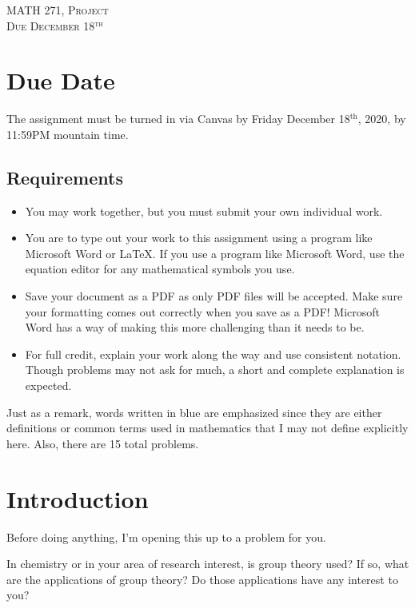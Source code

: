 \documentclass{article}
\theoremstyle{indented}
\begin{document}
\begin{center}
   \LARGE{\textsc{MATH 271, Project}}\\
   \large{\textsc{Due December 18$^\textrm{th}$}}
\end{center}
\vspace{.5cm}

\section*{Due Date}
The assignment must be turned in via Canvas by Friday December 18$^\textrm{th}$, 2020, by 11:59PM mountain time.
\subsection*{Requirements}
\begin{itemize}
    \item You may work together, but you must submit your own individual work.
    \item You are to type out your work to this assignment using a program like Microsoft Word or \LaTeX. If you use a program like Microsoft Word, use the equation editor for any mathematical symbols you use.
    \item Save your document as a PDF as only PDF files will be accepted. Make sure your formatting comes out correctly when you save as a PDF! Microsoft Word has a way of making this more challenging than it needs to be.
    \item For full credit, explain your work along the way and use consistent notation.  Though problems may not ask for much, a short and complete explanation is expected.
\end{itemize}

Just as a remark, words written in blue are emphasized since they are either definitions or common terms used in mathematics that I may not define explicitly here. Also, there are 15 total problems.

\section{Introduction}

Before doing anything, I'm opening this up to a problem for you.

\begin{problem}{}{}
In chemistry or in your area of research interest, is group theory used? If so, what are the applications of group theory? Do those applications have any interest to you?
\end{problem}
\end{document}
